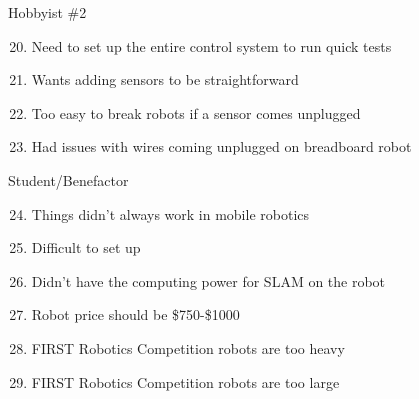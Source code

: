 \documentclass{fank1basedocument}
\begin{document}
Hobbyist \#2
\begin{enumerate}
	\setcounter{enumi}{19}
	\item Need to set up the entire control system to run quick tests
	\item Wants adding sensors to be straightforward
	\item Too easy to break robots if a sensor comes unplugged
	\item Had issues with wires coming unplugged on breadboard robot
\end{enumerate}
Student/Benefactor
\begin{enumerate}
	\setcounter{enumi}{23}
	\item Things didn’t always work in mobile robotics
	\item Difficult to set up
	\item Didn’t have the computing power for SLAM on the robot
	\item Robot price should be \$750-\$1000
	\item FIRST Robotics Competition robots are too heavy
	\item FIRST Robotics Competition robots are too large
\end{enumerate}

\end{document}

